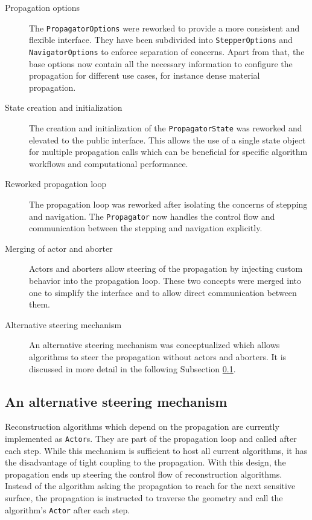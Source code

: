 \begin{description}
    \item[Propagation options] The \texttt{PropagatorOptions} were reworked to provide a more consistent and flexible interface. They have been subdivided into \texttt{StepperOptions} and \texttt{NavigatorOptions} to enforce separation of concerns. Apart from that, the base options now contain all the necessary information to configure the propagation for different use cases, for instance dense material propagation.
    \item[State creation and initialization] The creation and initialization of the \texttt{PropagatorState} was reworked and elevated to the public interface. This allows the use of a single state object for multiple propagation calls which can be beneficial for specific algorithm workflows and computational performance.
    \item[Reworked propagation loop] The propagation loop was reworked after isolating the concerns of stepping and navigation. The \texttt{Propagator} now handles the control flow and communication between the stepping and navigation explicitly.
    \item[Merging of actor and aborter] Actors and aborters allow steering of the propagation by injecting custom behavior into the propagation loop. These two concepts were merged into one to simplify the interface and to allow direct communication between them.
    \item[Alternative steering mechanism] An alternative steering mechanism was conceptualized which allows algorithms to steer the propagation without actors and aborters. It is discussed in more detail in the following Subsection \ref{subsec:dev/general/alternative-steering}.
\end{description}

\subsection{An alternative steering mechanism}
\label{subsec:dev/general/alternative-steering}

Reconstruction algorithms which depend on the propagation are currently implemented as \texttt{Actor}s. They are part of the propagation loop and called after each step. While this mechanism is sufficient to host all current algorithms, it has the disadvantage of tight coupling to the propagation. With this design, the propagation ends up steering the control flow of reconstruction algorithms. Instead of the algorithm asking the propagation to reach for the next sensitive surface, the propagation is instructed to traverse the geometry and call the algorithm's \texttt{Actor} after each step.

